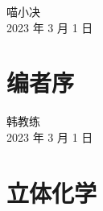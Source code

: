 \documentclass[
  10pt,
  twoside,
  openany,
  b5paper, %
  colorscheme = basic, %
]{qyxf-book}
\begin{document}
\begin{flushright}
	喵小决\\
	2023 年 3 月 1 日
\end{flushright}

\chapter*{编者序}



\begin{flushright}
	韩教练\\
	2023 年 3 月 1 日
\end{flushright}

\cleardoublepage


\tableofcontents

\chapter{立体化学}
\end{document}
